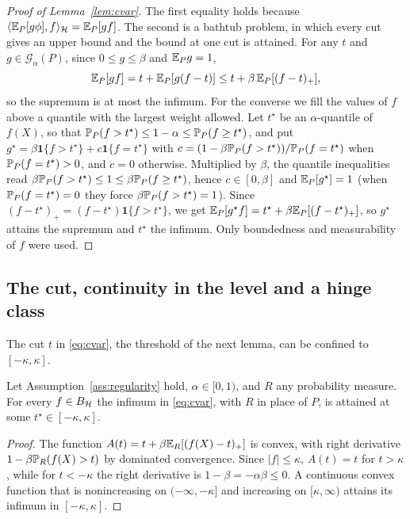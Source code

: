 \begin{proof}[Proof of Lemma~\ref{lem:cvar}]
The first equality holds because $\langle\mathbb{E}_P[g\phi],f\rangle_{\mathcal{H}}=\mathbb{E}_P[gf]$. The second is a bathtub problem, in
which every cut gives an upper bound and the bound at one cut is attained. For any $t$ and $g\in\mathcal G_\alpha(P)$, since
$0\le g\le\beta$ and $\mathbb{E}_Pg=1$,
\[
\mathbb{E}_P[gf]=t+\mathbb{E}_P[g(f-t)]\le t+\beta\,\mathbb{E}_P[(f-t)_+] ,
\]
so the supremum is at most the infimum. For the converse we fill the values of $f$ above a quantile with the largest
weight allowed. Let $t^\star$ be an $\alpha$-quantile of $f(X)$, so that
$\mathbb{P}_P(f>t^\star)\le1-\alpha\le\mathbb{P}_P(f\ge t^\star)$, and put $g^\star=\beta\mathbf 1\{f>t^\star\}+c\mathbf
1\{f=t^\star\}$ with $c=(1-\beta\mathbb{P}_P(f>t^\star))/\mathbb{P}_P(f=t^\star)$ when $\mathbb{P}_P(f=t^\star)>0$, and $c=0$ otherwise. Multiplied by $\beta$, the quantile inequalities read
$\beta\mathbb{P}_P(f>t^\star)\le1\le\beta\mathbb{P}_P(f\ge t^\star)$, hence $c\in[0,\beta]$ and $\mathbb{E}_P[g^\star]=1$ (when
$\mathbb{P}_P(f=t^\star)=0$ they force $\beta\mathbb{P}_P(f>t^\star)=1$). Since $(f-t^\star)_+=(f-t^\star)\mathbf 1\{f>t^\star\}$,
we get $\mathbb{E}_P[g^\star f]=t^\star+\beta\mathbb{E}_P[(f-t^\star)_+]$, so $g^\star$ attains the supremum and $t^\star$ the
infimum. Only boundedness and measurability of $f$ were used.
\end{proof}

\subsection{The cut, continuity in the level and a hinge class}

The cut $t$ in \eqref{eq:cvar}, the threshold of the next lemma, can be confined to $[-\kappa,\kappa]$.

\begin{lemma}
\label{lem:tcompact}
Let Assumption~\ref{ass:regularity} hold, $\alpha\in[0,1)$, and $R$ any probability measure. For every $f\in B_{\mathcal{H}}$
the infimum in \eqref{eq:cvar}, with $R$ in place of $P$, is attained at some $t^\star\in[-\kappa,\kappa]$.
\end{lemma}

\begin{proof}
The function $A(t)=t+\beta\mathbb{E}_R[(f(X)-t)_+]$ is convex, with right derivative $1-\beta\mathbb{P}_R(f(X)>t)$ by dominated
convergence. Since $|f|\le\kappa$, $A(t)=t$ for $t>\kappa$, while for $t<-\kappa$ the right derivative is
$1-\beta=-\alpha\beta\le0$. A continuous convex function that is nonincreasing on $(-\infty,-\kappa]$ and increasing
on $[\kappa,\infty)$ attains its infimum in $[-\kappa,\kappa]$.
\end{proof}

